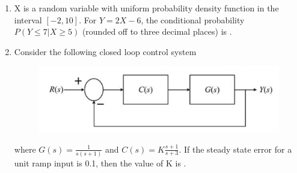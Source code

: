 \documentclass[a4paper, 11pt]{article}
\begin{document}
\begin{enumerate}
    \hfill{}

    \item X is a random variable with uniform probability density function in the interval $[-2, 10]$. For $Y=2X-6$, the conditional probability $P(Y \le 7 | X \ge 5)$ (rounded off to three decimal places) is \underline{\hspace{2cm}}.

    \hfill{}

    \item Consider the following closed loop control system
    \begin{figure}[H]
        \centering
        \includegraphics[width=0.6\columnwidth]{figs/Q55.png}
        \caption*{}
        \label{fig:q65}
    \end{figure}
    where $G(s) = \frac{1}{s(s+1)}$ and $C(s) = K\frac{s+1}{s+3}$. If the steady state error for a unit ramp input is 0.1, then the value of K is \underline{\hspace{2cm}}.
    
    \hfill{}

\end{enumerate}
\end{document}
